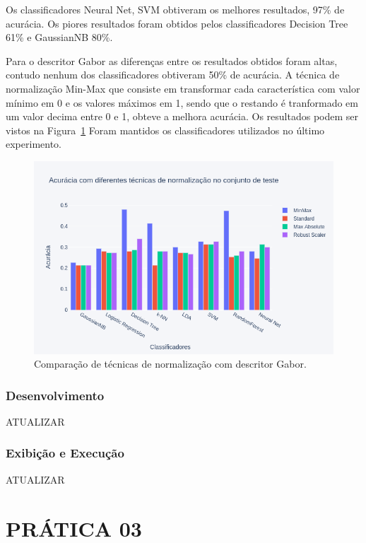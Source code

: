 \documentclass[a4paper, 12 pt, conference]{ieeeconf}  %
\begin{document}
Os classificadores Neural Net, SVM obtiveram os melhores resultados, 97\% de acurácia. Os piores resultados foram obtidos pelos classificadores Decision Tree 61\% e GaussianNB 80\%.

Para o descritor Gabor as diferenças entre os resultados obtidos foram altas, contudo nenhum dos classificadores obtiveram 50\% de acurácia. A técnica de normalização Min-Max que consiste em transformar cada característica com valor mínimo em 0 e os valores máximos em 1, sendo que o restando é tranformado em um valor decima entre 0 e 1, obteve a melhora acurácia. Os resultados podem ser vistos na Figura~\ref{fig:bar_norm_all_gabor} Foram mantidos os classificadores utilizados no último experimento.

\begin{figure}[!htbp]
	\centering
	\includegraphics[width=1.0\linewidth,clip=true,trim=0cm 0cm 0cm 0cm, keepaspectratio=true]{bar_norm_all_gabor.png}
	\caption{Comparação de técnicas de normalização com descritor Gabor.}
	\label{fig:bar_norm_all_gabor}
\end{figure}

\subsubsection{Desenvolvimento} ATUALIZAR
\subsubsection{Exibição e Execução} ATUALIZAR

\section{PRÁTICA 03}
\label{pratica03}
\end{document}
